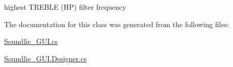 highest T\-R\-E\-B\-L\-E (H\-P) filter frequency 



The documentation for this class was generated from the following files\-:\begin{DoxyCompactItemize}
\item 
\hyperlink{_soundlie___g_u_i_8cs}{Soundlie\-\_\-\-G\-U\-I.\-cs}\item 
\hyperlink{_soundlie___g_u_i_8_designer_8cs}{Soundlie\-\_\-\-G\-U\-I.\-Designer.\-cs}\end{DoxyCompactItemize}
